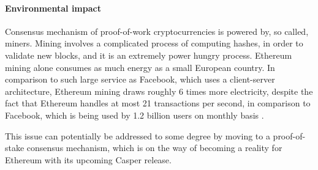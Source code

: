\paragraph{Environmental impact}
Consensus mechanism of proof-of-work cryptocurrencies is powered by, so called, miners. Mining involves a complicated process of computing hashes, in order to validate new blocks, and it is an extremely power hungry process. Ethereum mining alone consumes as much energy as a small European country. In comparison to such large service as Facebook, which uses a client-server architecture, Ethereum mining draws roughly 6 times more electricity, despite the fact that Ethereum handles at most 21 transactions per second, in comparison to Facebook, which is being used by 1.2 billion users on monthly basis \citep{faceusers}. 

This issue can potentially be addressed to some degree by moving to a proof-of-stake consensus mechanism, which is on the way of becoming a reality for Ethereum with its upcoming Casper release.
